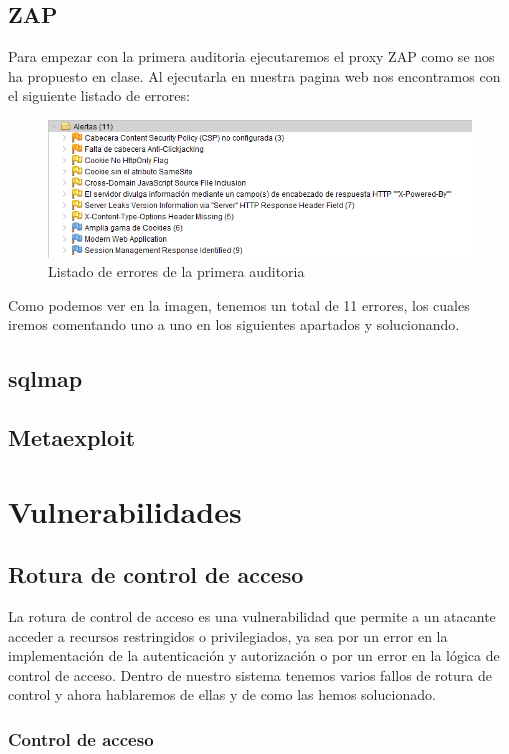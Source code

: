 \documentclass{report}
\begin{document}
        \section{ZAP}
        Para empezar con la primera auditoria ejecutaremos el proxy ZAP como se nos ha propuesto en clase.
        Al ejecutarla en nuestra pagina web nos encontramos con el siguiente listado de errores:
        \begin{figure}[H]
            \centering
            \includegraphics[width=\textwidth]{./img/audit1/zap1.png}
            \caption{Listado de errores de la primera auditoria}
        \end{figure}
        Como podemos ver en la imagen, tenemos un total de 11 errores, los cuales iremos comentando uno a uno en los siguientes apartados y solucionando.

        \section{sqlmap}

        \section{Metaexploit}
    \chapter{Vulnerabilidades}
        \section{Rotura de control de acceso}
            La rotura de control de acceso es una vulnerabilidad que permite a un atacante acceder a recursos restringidos o privilegiados, ya sea por un error en la implementación de la autenticación y autorización o por un error en la lógica de control de acceso.
            Dentro de nuestro sistema tenemos varios fallos de rotura de control y ahora hablaremos de ellas y de como las hemos solucionado.
            \subsection{Control de acceso}
\end{document}
